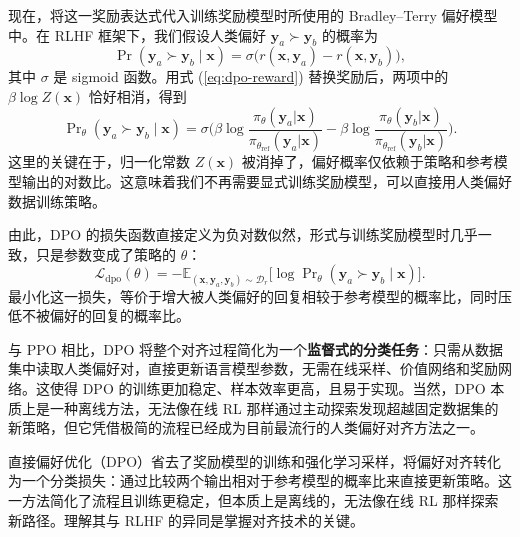 现在，将这一奖励表达式代入训练奖励模型时所使用的 Bradley–Terry 偏好模型中。在 RLHF 框架下，我们假设人类偏好 $\mathbf{y}_a \succ \mathbf{y}_b$ 的概率为
\begin{equation}
\Pr(\mathbf{y}_a \succ \mathbf{y}_b\mid\mathbf{x}) = \sigma\big(r(\mathbf{x},\mathbf{y}_a) - r(\mathbf{x},\mathbf{y}_b)\big),
\end{equation}
其中 $\sigma$ 是 sigmoid 函数。用式 (\ref{eq:dpo-reward}) 替换奖励后，两项中的 $\beta\log Z(\mathbf{x})$ 恰好相消，得到
\begin{equation}
\Pr\nolimits_{\theta}(\mathbf{y}_a \succ \mathbf{y}_b\mid\mathbf{x}) =
\sigma\!\Big(\beta\log\frac{\pi_{\theta}(\mathbf{y}_a|\mathbf{x})}{\pi_{\theta_{\mathrm{ref}}}(\mathbf{y}_a|\mathbf{x})}
- \beta\log\frac{\pi_{\theta}(\mathbf{y}_b|\mathbf{x})}{\pi_{\theta_{\mathrm{ref}}}(\mathbf{y}_b|\mathbf{x})}\Big).
\label{eq:dpo-preference}
\end{equation}
这里的关键在于，归一化常数 $Z(\mathbf{x})$ 被消掉了，偏好概率仅依赖于策略和参考模型输出的对数比。这意味着我们不再需要显式训练奖励模型，可以直接用人类偏好数据训练策略。

由此，DPO 的损失函数直接定义为负对数似然，形式与训练奖励模型时几乎一致，只是参数变成了策略的 $\theta$：
\begin{equation}
\mathcal{L}_{\mathrm{dpo}}(\theta) = -\mathbb{E}_{(\mathbf{x},\mathbf{y}_a,\mathbf{y}_b)\sim\mathcal{D}_r}
\Big[\log \Pr\nolimits_{\theta}(\mathbf{y}_a \succ \mathbf{y}_b\mid\mathbf{x})\Big].
\label{eq:dpo-loss}
\end{equation}
最小化这一损失，等价于增大被人类偏好的回复相较于参考模型的概率比，同时压低不被偏好的回复的概率比。

与 PPO 相比，DPO 将整个对齐过程简化为一个\textbf{监督式的分类任务}：只需从数据集中读取人类偏好对，直接更新语言模型参数，无需在线采样、价值网络和奖励网络。这使得 DPO 的训练更加稳定、样本效率更高，且易于实现。当然，DPO 本质上是一种离线方法，无法像在线 RL 那样通过主动探索发现超越固定数据集的新策略，但它凭借极简的流程已经成为目前最流行的人类偏好对齐方法之一。

\begin{importantnote}
直接偏好优化（DPO）省去了奖励模型的训练和强化学习采样，将偏好对齐转化为一个分类损失：通过比较两个输出相对于参考模型的概率比来直接更新策略。这一方法简化了流程且训练更稳定，但本质上是离线的，无法像在线 RL 那样探索新路径。理解其与 RLHF 的异同是掌握对齐技术的关键。
\end{importantnote}



